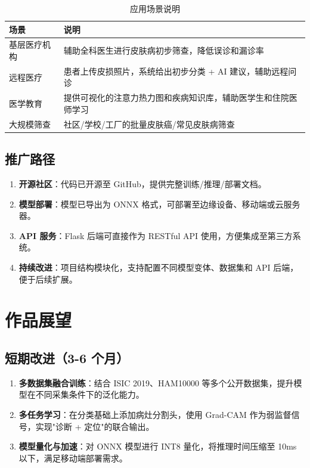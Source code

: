 \documentclass[12pt,a4paper]{report}
\begin{document}
\begin{table}[H]
    \centering
    \caption{应用场景说明}
    \label{tab:application_scenarios}
    \begin{tabularx}{\linewidth}{l X}
        \toprule
        \textbf{场景} & \textbf{说明} \\
        \midrule
        基层医疗机构 & 辅助全科医生进行皮肤病初步筛查，降低误诊和漏诊率 \\
        远程医疗 & 患者上传皮损照片，系统给出初步分类 + AI 建议，辅助远程问诊 \\
        医学教育 & 提供可视化的注意力热力图和疾病知识库，辅助医学生和住院医师学习 \\
        大规模筛查 & 社区/学校/工厂的批量皮肤癌/常见皮肤病筛查 \\
        \bottomrule
    \end{tabularx}
\end{table}

\subsection{推广路径}

\begin{enumerate}[leftmargin=2em, itemsep=0.3em]
    \item \textbf{开源社区}：代码已开源至 GitHub，提供完整训练/推理/部署文档。
    \item \textbf{模型部署}：模型已导出为 ONNX 格式，可部署至边缘设备、移动端或云服务器。
    \item \textbf{API 服务}：Flask 后端可直接作为 RESTful API 使用，方便集成至第三方系统。
    \item \textbf{持续改进}：项目结构模块化，支持配置不同模型变体、数据集和 API 后端，便于后续扩展。
\end{enumerate}

\section{作品展望}

\subsection{短期改进（3-6 个月）}

\begin{enumerate}[leftmargin=2em, itemsep=0.3em]
    \item \textbf{多数据集融合训练}：结合 ISIC 2019、HAM10000 等多个公开数据集，提升模型在不同采集条件下的泛化能力。
    \item \textbf{多任务学习}：在分类基础上添加病灶分割头，使用 Grad-CAM 作为弱监督信号，实现"诊断 + 定位"的联合输出。
    \item \textbf{模型量化与加速}：对 ONNX 模型进行 INT8 量化，将推理时间压缩至 10ms 以下，满足移动端部署需求。
\end{enumerate}
\end{document}
